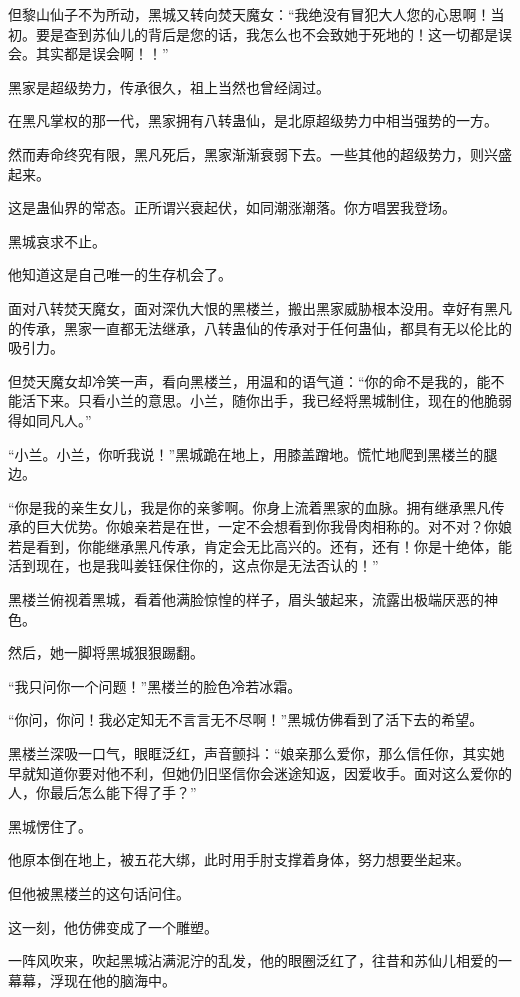\begin{this_body}
但黎山仙子不为所动，黑城又转向焚天魔女：“我绝没有冒犯大人您的心思啊！当初。要是查到苏仙儿的背后是您的话，我怎么也不会致她于死地的！这一切都是误会。其实都是误会啊！！”

黑家是超级势力，传承很久，祖上当然也曾经阔过。

在黑凡掌权的那一代，黑家拥有八转蛊仙，是北原超级势力中相当强势的一方。

然而寿命终究有限，黑凡死后，黑家渐渐衰弱下去。一些其他的超级势力，则兴盛起来。

这是蛊仙界的常态。正所谓兴衰起伏，如同潮涨潮落。你方唱罢我登场。

黑城哀求不止。

他知道这是自己唯一的生存机会了。

面对八转焚天魔女，面对深仇大恨的黑楼兰，搬出黑家威胁根本没用。幸好有黑凡的传承，黑家一直都无法继承，八转蛊仙的传承对于任何蛊仙，都具有无以伦比的吸引力。

但焚天魔女却冷笑一声，看向黑楼兰，用温和的语气道：“你的命不是我的，能不能活下来。只看小兰的意思。小兰，随你出手，我已经将黑城制住，现在的他脆弱得如同凡人。”

“小兰。小兰，你听我说！”黑城跪在地上，用膝盖蹭地。慌忙地爬到黑楼兰的腿边。

“你是我的亲生女儿，我是你的亲爹啊。你身上流着黑家的血脉。拥有继承黑凡传承的巨大优势。你娘亲若是在世，一定不会想看到你我骨肉相称的。对不对？你娘若是看到，你能继承黑凡传承，肯定会无比高兴的。还有，还有！你是十绝体，能活到现在，也是我叫姜钰保住你的，这点你是无法否认的！”

黑楼兰俯视着黑城，看着他满脸惊惶的样子，眉头皱起来，流露出极端厌恶的神色。

然后，她一脚将黑城狠狠踢翻。

“我只问你一个问题！”黑楼兰的脸色冷若冰霜。

“你问，你问！我必定知无不言言无不尽啊！”黑城仿佛看到了活下去的希望。

黑楼兰深吸一口气，眼眶泛红，声音颤抖：“娘亲那么爱你，那么信任你，其实她早就知道你要对他不利，但她仍旧坚信你会迷途知返，因爱收手。面对这么爱你的人，你最后怎么能下得了手？”

黑城愣住了。

他原本倒在地上，被五花大绑，此时用手肘支撑着身体，努力想要坐起来。

但他被黑楼兰的这句话问住。

这一刻，他仿佛变成了一个雕塑。

一阵风吹来，吹起黑城沾满泥泞的乱发，他的眼圈泛红了，往昔和苏仙儿相爱的一幕幕，浮现在他的脑海中。


\end{this_body}
